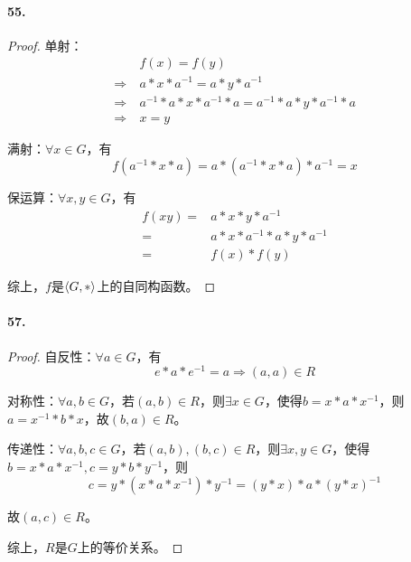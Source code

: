 \documentclass[12pt, a4paper, oneside]{ctexart}
\begin{document}
\paragraph{55.}\begin{proof}
    单射：
    \begin{equation*}
        \begin{aligned}
            &f(x)=f(y)\\
            \Rightarrow\ &a*x*a^{-1}=a*y*a^{-1}\\
            \Rightarrow\ &a^{-1}*a*x*a^{-1}*a=a^{-1}*a*y*a^{-1}*a\\
            \Rightarrow\ &x=y
        \end{aligned}
    \end{equation*}

    满射：$\forall x\in G$，有
    \begin{equation*}
            f(a^{-1}*x*a)=a*(a^{-1}*x*a)*a^{-1}=x
    \end{equation*}

    保运算：$\forall x,y\in G$，有
    \begin{equation*}
        \begin{aligned}
            f(xy)=&a*x*y*a^{-1}\\
            =&a*x*a^{-1}*a*y*a^{-1}\\
            =&f(x)*f(y)
        \end{aligned}
    \end{equation*}

    综上，$f$是$\braket{G,*}$上的自同构函数。
\end{proof}
\paragraph{57.}\begin{proof}
    自反性：$\forall a\in G$，有
    \begin{equation*}
        e*a*e^{-1}=a\Rightarrow (a,a)\in R
    \end{equation*}

    对称性：$\forall a, b\in G$，若$(a,b)\in R$，则$\exists x\in G$，使得$b=x*a*x^{-1}$，则$a=x^{-1}*b*x$，故$(b,a)\in R$。

    传递性：$\forall a,b,c\in G$，若$(a,b),(b,c)\in R$，则$\exists x, y\in G$，使得$b=x*a*x^{-1},c=y*b*y^{-1}$，则
    \begin{equation*}
        c=y*(x*a*x^{-1})*y^{-1}=(y*x)*a*(y*x)^{-1}
    \end{equation*}

    故$(a,c)\in R$。

    综上，$R$是$G$上的等价关系。
\end{proof}
\end{document}
